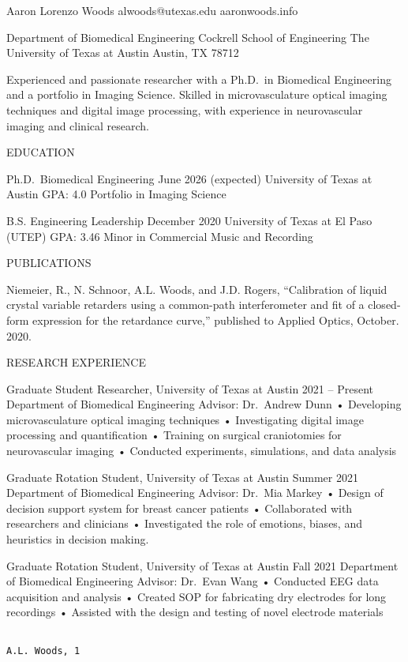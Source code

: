 \documentclass[
]{article}
\author{}
\date{}
\begin{document}
Aaron Lorenzo Woods alwoods@utexas.edu \textbar{} aaronwoods.info

Department of Biomedical Engineering Cockrell School of Engineering The
University of Texas at Austin Austin, TX 78712

Experienced and passionate researcher with a Ph.D.~in Biomedical
Engineering and a portfolio in Imaging Science. Skilled in
microvasculature optical imaging techniques and digital image
processing, with experience in neurovascular imaging and clinical
research.

EDUCATION

Ph.D.~Biomedical Engineering June 2026 (expected) University of Texas at
Austin GPA: 4.0 Portfolio in Imaging Science

B.S. Engineering Leadership December 2020 University of Texas at El Paso
(UTEP) GPA: 3.46 Minor in Commercial Music and Recording

PUBLICATIONS

Niemeier, R., N. Schnoor, A.L. Woods, and J.D. Rogers, ``Calibration of
liquid crystal variable retarders using a common-path interferometer and
fit of a closed-form expression for the retardance curve,'' published to
Applied Optics, October. 2020.

RESEARCH EXPERIENCE

Graduate Student Researcher, University of Texas at Austin 2021 --
Present Department of Biomedical Engineering \textbar{} Advisor:
Dr.~Andrew Dunn • Developing microvasculature optical imaging techniques
• Investigating digital image processing and quantification • Training
on surgical craniotomies for neurovascular imaging • Conducted
experiments, simulations, and data analysis

Graduate Rotation Student, University of Texas at Austin Summer 2021
Department of Biomedical Engineering \textbar{} Advisor: Dr.~Mia Markey
• Design of decision support system for breast cancer patients •
Collaborated with researchers and clinicians • Investigated the role of
emotions, biases, and heuristics in decision making.

Graduate Rotation Student, University of Texas at Austin Fall 2021
Department of Biomedical Engineering \textbar{} Advisor: Dr.~Evan Wang •
Conducted EEG data acquisition and analysis • Created SOP for
fabricating dry electrodes for long recordings • Assisted with the
design and testing of novel electrode materials

\begin{verbatim}
                                                                                            A.L. Woods, 1
\end{verbatim}
\end{document}
